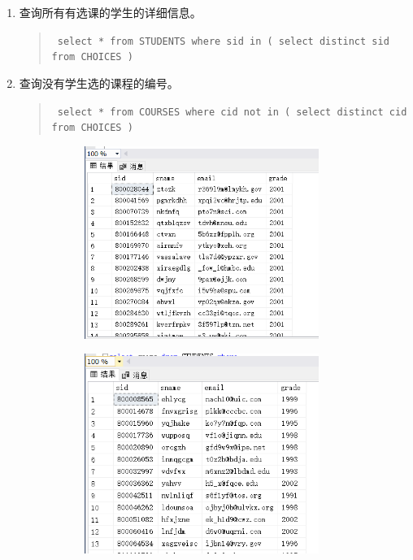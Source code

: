 \documentclass[a4paper,twoside]{article}
\begin{document}
\begin{spacing}{1.2}
\begin{enumerate}
\item 查询所有有选课的学生的详细信息。
\begin{quote}
\texttt{
select * from STUDENTS 
where sid in (
select distinct sid from CHOICES
)
}
\end{quote}
\item 查询没有学生选的课程的编号。
\begin{quote}
\texttt{
select * from COURSES
where cid not in (
select distinct cid from CHOICES
)
}
\end{quote}

\begin{figure}[h]
\centering
\caption{运行结果}
\begin{subfigure}{0.3\textwidth}
  \includegraphics[width=0.9\textwidth]{fig17.png}
\end{subfigure}
\begin{subfigure}{0.3\textwidth}
  \includegraphics[width=0.9\textwidth]{fig18.png}
\end{subfigure}
\end{figure}



\end{enumerate}
\end{spacing}
\end{document}
